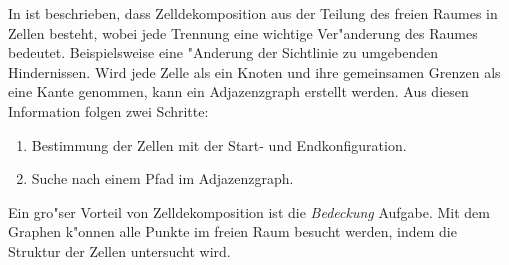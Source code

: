 In \cite{Principles:05} ist beschrieben, dass Zelldekomposition aus der Teilung des freien Raumes in Zellen besteht, wobei jede Trennung eine wichtige Ver"anderung des Raumes bedeutet. Beispielsweise eine "Anderung der Sichtlinie zu umgebenden Hindernissen. Wird jede Zelle als ein Knoten und ihre gemeinsamen Grenzen als eine Kante genommen, kann ein Adjazenzgraph erstellt werden. 
Aus diesen Information folgen zwei Schritte: 
\begin{enumerate}
	\item Bestimmung der Zellen mit der Start- und Endkonfiguration. 
	\item Suche nach einem Pfad im Adjazenzgraph.
\end{enumerate}
Ein gro{"s}er Vorteil von Zelldekomposition ist die \textit{Bedeckung} Aufgabe. Mit dem Graphen k"onnen alle Punkte im freien Raum besucht werden, indem die Struktur der Zellen untersucht wird.

